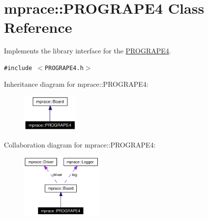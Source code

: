 \hypertarget{classmprace_1_1PROGRAPE4}{
\section{mprace::PROGRAPE4 Class Reference}
\label{classmprace_1_1PROGRAPE4}
}
Implements the library interface for the \hyperlink{classmprace_1_1PROGRAPE4}{PROGRAPE4}.  


{\tt \#include $<$PROGRAPE4.h$>$}

Inheritance diagram for mprace::PROGRAPE4:\begin{figure}[H]
\begin{center}
\leavevmode
\includegraphics[width=81pt]{classmprace_1_1PROGRAPE4__inherit__graph}
\end{center}
\end{figure}
Collaboration diagram for mprace::PROGRAPE4:\begin{figure}[H]
\begin{center}
\leavevmode
\includegraphics[width=115pt]{classmprace_1_1PROGRAPE4__coll__graph}
\end{center}
\end{figure}
